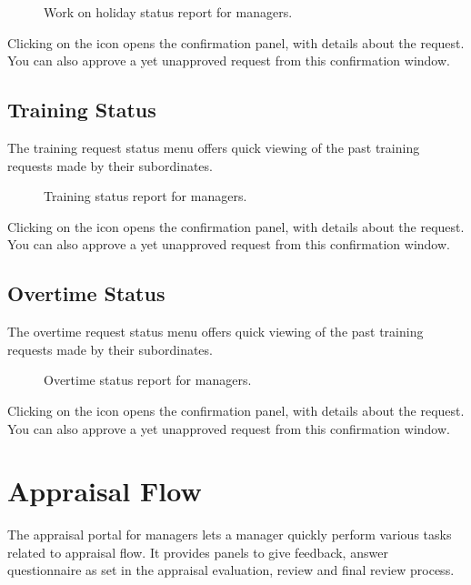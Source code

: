 \documentclass[letterpaper,10pt,english]{sphinxmanual}
\begin{document}
\begin{figure}[htbp]
\centering
\capstart

\noindent{}
\caption{Work on holiday status report for managers.}\label{\detokenize{manager/status-reporting:id8}}\end{figure}

Clicking on the  \sphinxstyleemphasis{} icon opens the confirmation panel, with details about the request. You can also approve a yet unapproved request from this confirmation window.


\subsection{Training Status}
\label{\detokenize{manager/status-reporting:training-status}}
The training request status menu offers quick viewing of the past training requests made by their subordinates.

\begin{figure}[htbp]
\centering
\capstart

\noindent{}
\caption{Training status report for managers.}\label{\detokenize{manager/status-reporting:id9}}\end{figure}

Clicking on the  \sphinxstyleemphasis{} icon opens the confirmation panel, with details about the request. You can also approve a yet unapproved request from this confirmation window.


\subsection{Overtime Status}
\label{\detokenize{manager/status-reporting:overtime-status}}
The overtime request status menu offers quick viewing of the past training requests made by their subordinates.

\begin{figure}[htbp]
\centering
\capstart

\noindent{}
\caption{Overtime status report for managers.}\label{\detokenize{manager/status-reporting:id10}}\end{figure}

Clicking on the  \sphinxstyleemphasis{} icon opens the confirmation panel, with details about the request. You can also approve a yet unapproved request from this confirmation window.


\section{Appraisal Flow}
\label{\detokenize{manager/appraisal:appraisal-flow}}\label{\detokenize{manager/appraisal::doc}}
The appraisal portal for managers lets a manager quickly perform various tasks related to appraisal flow. It provides panels to give feedback, answer questionnaire as set in the appraisal evaluation, review and final review process.



\renewcommand{\indexname}{Index}
\printindex
\end{document}
